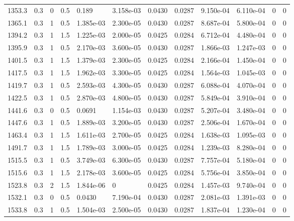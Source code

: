 \documentclass[preview]{standalone}
\begin{document}
{{{\begin{tabular}{L{1.2cm}C{1.2cm} C{0.3cm}C{0.5cm} C{1.4cm}C{1.4cm} C{1.4cm}C{1.4cm} C{1.6cm}C{1.6cm} C{1.6cm}C{1.6cm}}
  1353.3  &   0.3  & 0     & 0.5 &  0.189  & 3.158e-03  &  0.0430&   0.0287& 9.150e-04 & 6.110e-04   &  0 & 0  \\ 
  1365.1  &   0.3  & 1     & 0.5 &  1.385e-03  & 2.300e-05  &  0.0430&   0.0287& 8.687e-04 & 5.800e-04   &  0 & 0  \\ 
  1394.2  &   0.3  & 1     & 1.5 &  1.225e-03  & 2.000e-05  &  0.0425&   0.0284& 6.712e-04 & 4.480e-04   &  0 & 0  \\ 
  1395.9  &   0.3  & 1     & 0.5 &  2.170e-03  & 3.600e-05  &  0.0430&   0.0287& 1.866e-03 & 1.247e-03   &  0 & 0  \\ 
  1401.5  &   0.3  & 1     & 1.5 &  1.379e-03  & 2.300e-05  &  0.0425&   0.0284& 2.166e-04 & 1.450e-04   &  0 & 0  \\ 
  1417.5  &   0.3  & 1     & 1.5 &  1.962e-03  & 3.300e-05  &  0.0425&   0.0284& 1.564e-03 & 1.045e-03   &  0 & 0  \\ 
  1419.7  &   0.3  & 1     & 0.5 &  2.593e-03  & 4.300e-05  &  0.0430&   0.0287& 6.088e-04 & 4.070e-04   &  0 & 0  \\ 
  1422.5  &   0.3  & 1     & 0.5 &  2.870e-03  & 4.800e-05  &  0.0430&   0.0287& 5.849e-04 & 3.910e-04   &  0 & 0  \\ 
  1441.6  &   0.3  & 0     & 0.5 &  0.0691  & 1.154e-03  &  0.0430&   0.0287& 5.207e-04 & 3.480e-04   &  0 & 0  \\ 
  1447.6  &   0.3  & 1     & 0.5 &  1.889e-03  & 3.200e-05  &  0.0430&   0.0287& 2.506e-04 & 1.670e-04   &  0 & 0  \\ 
  1463.4  &   0.3  & 1     & 1.5 &  1.611e-03  & 2.700e-05  &  0.0425&   0.0284& 1.638e-03 & 1.095e-03   &  0 & 0  \\ 
  1491.7  &   0.3  & 1     & 1.5 &  1.789e-03  & 3.000e-05  &  0.0425&   0.0284& 1.239e-03 & 8.280e-04   &  0 & 0  \\ 
  1515.5  &   0.3  & 1     & 0.5 &  3.749e-03  & 6.300e-05  &  0.0430&   0.0287& 7.757e-04 & 5.180e-04   &  0 & 0  \\ 
  1515.6  &   0.3  & 1     & 1.5 &  2.178e-03  & 3.600e-05  &  0.0425&   0.0284& 5.756e-04 & 3.850e-04   &  0 & 0  \\ 
  1523.8  &   0.3  & 2     & 1.5 &  1.844e-06  & 0  &  0.0425&   0.0284& 1.457e-03 & 9.740e-04   &  0 & 0  \\ 
  1532.1  &   0.3  & 0     & 0.5 &  0.0430  & 7.190e-04  &  0.0430&   0.0287& 2.081e-03 & 1.391e-03   &  0 & 0  \\ 
  1533.8  &   0.3  & 1     & 0.5 &  1.504e-03  & 2.500e-05  &  0.0430&   0.0287& 1.837e-04 & 1.230e-04   &  0 & 0  \\ 

\end{tabular}}}}
\end{document}
